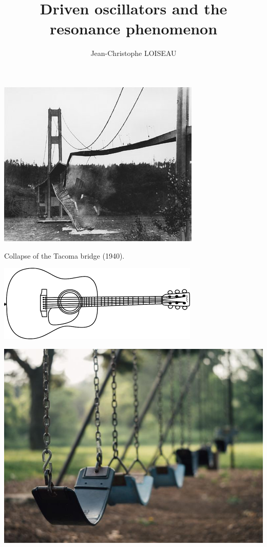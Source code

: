 \documentclass[aspectratio=169]{beamer}
\title{Driven oscillators and the resonance phenomenon}
\author{Jean-Christophe LOISEAU}
\institute{Arts \& Métiers Institute of Technology, January 2022}
\date{}
\begin{document}
\frame{\titlepage}

{
  \begin{frame}
    \centering

    \includegraphics[height=.8\textheight]{tacoma_bridge}

    {
      \color{black}
      Collapse of the Tacoma bridge (1940).
    }
    
  \end{frame}

  \begin{frame}
    \vfill
    \begin{minipage}{.48\textwidth}
      \centering
      \includegraphics[width=\textwidth]{guitar}
    \end{minipage}%
    \hfill
    \begin{minipage}{.48\textwidth}
      \centering
      \includegraphics[width=\textwidth]{balancoire}
    \end{minipage}
    \vfill
  \end{frame}
}
\end{document}
